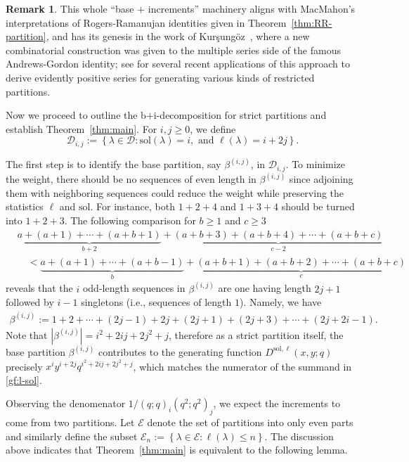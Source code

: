 \documentclass[11pt,reqno]{amsart}
\numberwithin{equation}{section}
\theoremstyle{plain}
\theoremstyle{definition}
\newtheorem{remark}[theorem]{Remark}
\newcommand{\set}[1]{\left\{#1\right\}}
\def\E{\mathcal{E}}
\def\sol{\mathrm{sol}}
\def\la{\lambda}
\newcommand{\D}{\mathcal{D}}
\begin{document}
\begin{remark}\label{rmk:Kagan's credit}
This whole ``base $+$ increments'' machinery aligns with MacMahon's interpretations of Rogers-Ramanujan identities given in Theorem~\ref{thm:RR-partition}, and has its genesis in the work of Kur\c{s}ung\"{o}z~\cite{kur10}, where a new combinatorial construction was given to the multiple series side of the famous Andrews-Gordon identity; see \cite{kur19,kur21,KS22} for several recent applications of this approach to derive evidently positive series for generating various kinds of restricted partitions.
\end{remark}

Now we proceed to outline the b$+$i-decomposition for strict partitions and establish Theorem~\ref{thm:main}. For $i,j\ge 0$, we define 
$$\D_{i,j}:=\set{\la\in\D: \sol(\la)=i, \text{ and }\ell(\la)=i+2j}.$$

The first step is to identify the base partition, say $\beta^{(i,j)}$, in $\D_{i,j}$. To minimize the weight, there should be no sequences of even length in $\beta^{(i,j)}$ since adjoining them with neighboring sequences could reduce the weight while preserving the statistics $\ell$ and $\sol$. For instance, both $1+2+4$ and $1+3+4$ should be turned into $1+2+3$. The following comparison for $b\ge 1$ and $c\ge 3$
\begin{align*}
&\underbrace{a+(a+1)+\cdots+(a+b+1)}_{b+2}+\underbrace{(a+b+3)+(a+b+4)+\cdots+(a+b+c)}_{c-2}\\
&\quad <\underbrace{a+(a+1)+\cdots+(a+b-1)}_{b}+\underbrace{(a+b+1)+(a+b+2)+\cdots+(a+b+c)}_{c}
\end{align*}
reveals that the $i$ odd-length sequences in $\beta^{(i,j)}$ are one having length $2j+1$ followed by $i-1$ singletons (i.e., sequences of length $1$). Namely, we have
\begin{align}\label{base for main thm}
\beta^{(i,j)}:=1+2+\cdots+(2j-1)+2j+(2j+1)+(2j+3)+\cdots+(2j+2i-1).
\end{align}
Note that $|\beta^{(i,j)}|=i^2+2ij+2j^2+j$, therefore as a strict partition itself, the base partition $\beta^{(i,j)}$ contributes to the generating function $D^{\sol,\ell}(x,y;q)$ precisely $x^{i}y^{i+2j}q^{i^2+2ij+2j^2+j}$, which matches the numerator of the summand in \eqref{gf:l-sol}.

Observing the denomenator $1/(q;q)_i(q^2;q^2)_j$, we expect the increments to come from two partitions. Let $\E$ denote the set of partitions into only even parts and similarly define the subset $\E_n:=\set{\la\in\E: \ell(\la)\le n}$. The discussion above indicates that Theorem~\ref{thm:main} is equivalent to the following lemma.
\end{document}
